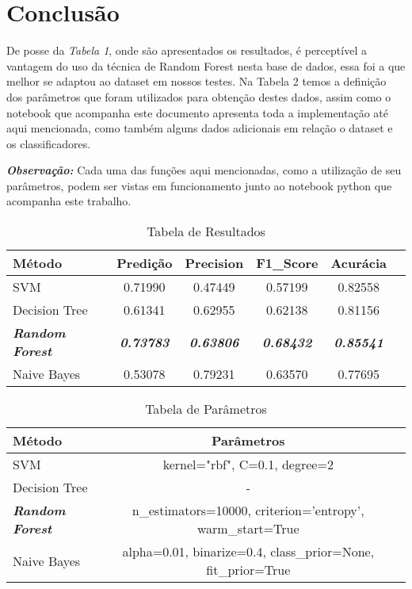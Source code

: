 \documentclass[
	12pt,				    %
	openright,			    %
	oneside,			    %
	a4paper,			    %
    sumario=tradicional,    %
	english,			    %
	brazil,				    %
	]{abntex2}
\begin{document}
\chapter{Conclusão}\label{sec:conclusão}
De posse da \textit{Tabela 1}, onde são apresentados os resultados, é perceptível a vantagem do uso da técnica de Random Forest nesta base de dados, essa foi a que melhor se adaptou ao dataset em nossos testes. Na Tabela 2 temos a definição dos parâmetros que foram utilizados para obtenção destes dados, assim como o notebook que acompanha este documento apresenta toda a implementação até aqui mencionada, como também alguns dados adicionais em relação o dataset e os classificadores.

\textbf{\textit{Observação:}} Cada uma das funções aqui mencionadas, como a utilização de seu parâmetros, podem ser vistas em funcionamento junto ao notebook python que acompanha este trabalho.

\begin{table}[htbp]
  \centering
    \caption[Tabela de Resultados]{Tabela de Resultados}
    \label{tab:resultados}
    \begin{tabular}{lccccc} %
    \toprule
    \textbf{Método} & \textbf{Predição} & \textbf{Precision} & \textbf{F1\_Score} & \textbf{Acurácia} \\
    \midrule
        SVM & 0.71990 & 0.47449 & 0.57199 & 0.82558 \\
        Decision Tree & 0.61341 & 0.62955 & 0.62138 & 0.81156 \\
        \textit{\textbf{Random Forest}} & \textit{\textbf{0.73783}} & \textit{\textbf{0.63806}} & \textbf{\textit{0.68432}} & \textbf{\textit{0.85541}} \\
        Naive Bayes & 0.53078 & 0.79231 & 0.63570 & 0.77695 \\
    \bottomrule
    \end{tabular}%
\end{table}%

\begin{table}[htbp]
  \centering
    \caption[Tabela de Parâmetros]{Tabela de Parâmetros}
    \label{tab:parametros}
    \begin{tabular}{lcc} %
    \toprule
    \textbf{Método} & \textbf{Parâmetros} \\
    \midrule
        SVM & kernel="rbf", C=0.1, degree=2 \\
        Decision Tree & \-- \\
        \textit{\textbf{Random Forest}} & n\_estimators=10000, criterion='entropy', warm\_start=True \\
        Naive Bayes & alpha=0.01, binarize=0.4, class\_prior=None, fit\_prior=True \\
    \bottomrule
    \end{tabular}%
\end{table}%
\end{document}

